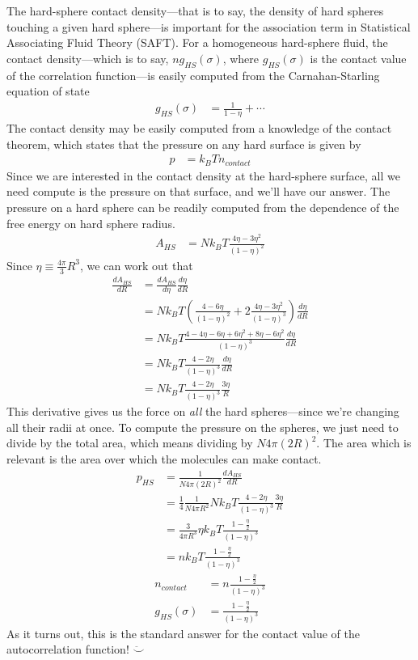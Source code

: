 \documentclass[letterpaper,twocolumn,amsmath,amssymb,prb]{revtex4-1}
\begin{document}
The hard-sphere contact density---that is to say, the density of hard
spheres touching a given hard sphere---is important for the
association term in Statistical Associating Fluid Theory (SAFT).  For
a homogeneous hard-sphere fluid, the contact density---which is to
say, $n g_{HS}(\sigma)$, where $g_{HS}(\sigma)$ is the contact value
of the correlation function---is easily computed from the
Carnahan-Starling equation of state
\begin{align}
  g_{HS}(\sigma) &= \frac{1}{1-\eta} + \cdots
\end{align}
The contact density may be easily computed from a knowledge of the
contact theorem, which states that the pressure on any hard surface is
given by
\begin{align}
  p &= k_BT n_\textit{contact}
\end{align}
Since we are interested in the contact density at the hard-sphere
surface, all we need compute is the pressure on that surface, and
we'll have our answer.  The pressure on a hard sphere can be readily
computed from the dependence of the free energy on hard sphere
radius.
\begin{align}
  A_{HS} &= Nk_BT \frac{4\eta - 3\eta^2}{(1-\eta)^2}
\end{align}
Since $\eta \equiv \frac{4\pi}{3} R^3$, we can work out that
\begin{align}
  \frac{dA_{HS}}{dR} &= \frac{dA_{HS}}{d\eta} \frac{d\eta}{dR} \\
  &= Nk_BT \left( \frac{4 - 6\eta}{(1-\eta)^2} + 2 \frac{4\eta - 3\eta^2}{(1-\eta)^3} \right) \frac{d\eta}{dR}
  \\
  &= Nk_BT \frac{4 - 4\eta - 6\eta + 6\eta^2 + 8\eta - 6\eta^2}{(1-\eta)^3} \frac{d\eta}{dR}
  \\
  &= Nk_BT \frac{4 - 2\eta}{(1-\eta)^3} \frac{d\eta}{dR}
  \\
  &= Nk_BT \frac{4 - 2\eta}{(1-\eta)^3} \frac{3 \eta}{R} \label{eq:dAhsdR}
\end{align}
This derivative gives us the force on \emph{all} the hard
spheres---since we're changing all their radii at once.  To compute
the pressure on the spheres, we just need to divide by the total area,
which means dividing by $N 4\pi (2R)^2$.  The area which is relevant
is the area over which the molecules can make contact.
\begin{align}
  p_{HS} &= \frac{1}{N 4\pi (2R)^2} \frac{dA_{HS}}{dR} \\
  &= \frac14 \frac{1}{N 4\pi R^2} Nk_BT \frac{4 - 2\eta}{(1-\eta)^3} \frac{3 \eta}{R} \\
  &= \frac{3}{4\pi R^3} \eta k_BT \frac{1 - \frac{\eta}2}{(1-\eta)^3} \\
  &= n k_BT \frac{1 - \frac{\eta}2}{(1-\eta)^3}
\end{align}
\begin{align}
  n_\textit{contact} &= n \frac{1 - \frac{\eta}2}{(1-\eta)^3} \\
  g_{HS}(\sigma) &= \frac{1 - \frac{\eta}2}{(1-\eta)^3}
\end{align}
As it turns out, this is the standard answer for the contact value of
the autocorrelation function! $\ddot\smile$
\end{document}
